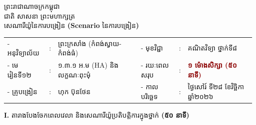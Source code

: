 \documentclass[a4paper,10pt]{article}
\newcommand{\enbf}[1]{{\TimesEn\textbf{#1}}}
\begin{document}
\fontsize{10pt}{14.8pt}\selectfont

\begin{center}
  {\muol\fontsize{11pt}{16pt}\selectfont ព្រះរាជាណាចក្រកម្ពុជា}\\[1pt]
  {\muol\fontsize{10pt}{15pt}\selectfont ជាតិ សាសនា ព្រះមហាក្សត្រ}\\[4pt]
  {\muol\fontsize{10.5pt}{15pt}\selectfont សេណារីយ៉ូនៃការបង្រៀន \enbf{(Scenario} នៃការបង្រៀន\enbf{)}}
\end{center}

\vspace{2pt}
{\renewcommand{\arraystretch}{1.06}
\begin{tabular}{@{}l l l p{0.5cm} l l l@{}}
  - អនុវិទ្យាល័យ & : & ព្រះក្រសាំង (កំពង់ស្វាយ-កំពង់ធំ) & & - មុខវិជ្ជា & : & គណិតវិទ្យា ថ្នាក់ទី៨ \\
  - មេរៀនទី១២ & : & ១.៣.១ អ.ម (HA) និងលក្ខណៈពុះមុំ & & - រយៈពេលសរុប & : & \textcolor{darkred}{\textbf{១ ម៉ោងសិក្សា (៥០ នាទី)}} \\
  - គ្រូបង្រៀន & : & ហុក ប៊ុនថែន & & - កាលបរិច្ឆេទ & : & ថ្ងៃសៅរ៍ ទី២៨ ខែវិច្ឆិកា ឆ្នាំ២០២៦ \\
\end{tabular}
}

\vspace{3pt}

\textbf{I.} {\muol តារាងបែងចែកពេលវេលា និងសេណារីយ៉ូប្រតិបត្តិការក្នុងថ្នាក់} \textbf{(៥០ នាទី)}
\end{document}
